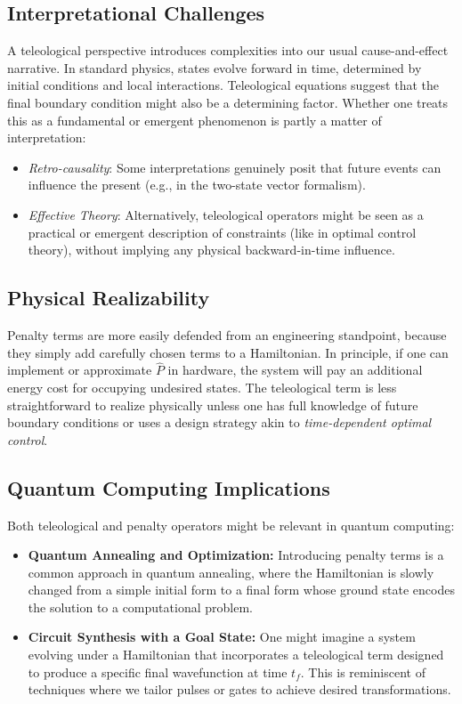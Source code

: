 \documentclass[11pt]{article}
\begin{document}
\subsection{Interpretational Challenges}
A teleological perspective introduces complexities into our usual cause-and-effect narrative. In standard physics, states evolve forward in time, determined by initial conditions and local interactions. Teleological equations suggest that the final boundary condition might also be a determining factor. Whether one treats this as a fundamental or emergent phenomenon is partly a matter of interpretation:
\begin{itemize}
    \item \emph{Retro-causality}: Some interpretations genuinely posit that future events can influence the present (e.g., in the two-state vector formalism).
    \item \emph{Effective Theory}: Alternatively, teleological operators might be seen as a practical or emergent description of constraints (like in optimal control theory), without implying any physical backward-in-time influence.
\end{itemize}

\subsection{Physical Realizability}
Penalty terms are more easily defended from an engineering standpoint, because they simply add carefully chosen terms to a Hamiltonian. In principle, if one can implement or approximate $\hat{P}$ in hardware, the system will pay an additional energy cost for occupying undesired states. The teleological term is less straightforward to realize physically unless one has full knowledge of future boundary conditions or uses a design strategy akin to \emph{time-dependent optimal control}.

\subsection{Quantum Computing Implications}
Both teleological and penalty operators might be relevant in quantum computing:
\begin{itemize}
    \item \textbf{Quantum Annealing and Optimization:} Introducing penalty terms is a common approach in quantum annealing, where the Hamiltonian is slowly changed from a simple initial form to a final form whose ground state encodes the solution to a computational problem.
    \item \textbf{Circuit Synthesis with a Goal State:} One might imagine a system evolving under a Hamiltonian that incorporates a teleological term designed to produce a specific final wavefunction at time $t_f$. This is reminiscent of techniques where we tailor pulses or gates to achieve desired transformations.
\end{itemize}
\end{document}
